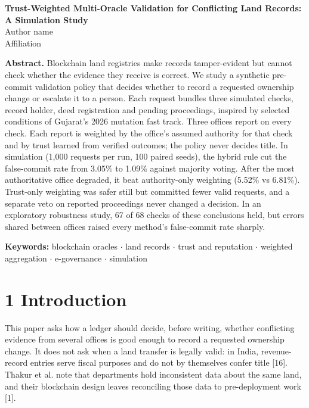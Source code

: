 \documentclass[10pt]{article}
\renewenvironment{abstract}{\small\quotation\noindent\textbf{Abstract.} }{\endquotation}
\begin{document}
\begin{center}{\large\bfseries Trust-Weighted Multi-Oracle Validation for Conflicting Land Records: A Simulation Study}\\[2mm] Author name\\ Affiliation\\[6mm]\end{center}
\begin{abstract}
Blockchain land registries make records tamper-evident but cannot check whether the evidence they receive is correct. We study a synthetic pre-commit validation policy that decides whether to record a requested ownership change or escalate it to a person. Each request bundles three simulated checks, record holder, deed registration and pending proceedings, inspired by selected conditions of Gujarat's 2026 mutation fast track. Three offices report on every check. Each report is weighted by the office's assumed authority for that check and by trust learned from verified outcomes; the policy never decides title. In simulation (1,000 requests per run, 100 paired seeds), the hybrid rule cut the false-commit rate from 3.05\% to 1.09\% against majority voting. After the most authoritative office degraded, it beat authority-only weighting (5.52\% vs 6.81\%). Trust-only weighting was safer still but committed fewer valid requests, and a separate veto on reported proceedings never changed a decision. In an exploratory robustness study, 67 of 68 checks of these conclusions held, but errors shared between offices raised every method's false-commit rate sharply.

\par\noindent\textbf{Keywords:}  blockchain oracles $\cdot$ land records $\cdot$ trust and reputation $\cdot$ weighted aggregation $\cdot$ e-governance $\cdot$ simulation\end{abstract}
\section*{1 Introduction}
This paper asks how a ledger should decide, before writing, whether conflicting evidence from several offices is good enough to record a requested ownership change. It does not ask when a land transfer is legally valid: in India, revenue-record entries serve fiscal purposes and do not by themselves confer title [16]. Thakur et al. note that departments hold inconsistent data about the same land, and their blockchain design leaves reconciling those data to pre-deployment work [1].
\end{document}
